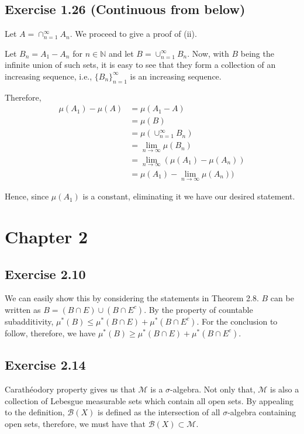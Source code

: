 \documentclass[12pt]{article}
\begin{document}
\subsection{Exercise 1.26 (Continuous from below)}

Let $A = \cap_{n=1}^{\infty} A_n$. We proceed to give a proof of (ii). \vskip 0.5cm

Let  $B_n = A_1 - A_n$ for $n \in \mathbb{N}$ and let $B = \cup_{n=1}^{\infty} B_n$. Now, with $B$ being the infinite union of such sets, it is easy to see that they form a collection of an increasing sequence, i.e., $\{B_n\}_{n=1}^{\infty}$ is an increasing sequence.

Therefore, 
\begin{align*}
\mu(A_1) - \mu(A) &= \mu(A_1 - A) \\
&= \mu(B)  \\
&= \mu(\cup_{n=1}^{\infty} B_n) \\
&= \lim_{n \rightarrow \infty} \mu(B_n)\\
&= \lim_{n \rightarrow \infty} (\mu(A_1) - \mu(A_n))\\
&= \mu(A_1) - \lim_{n \rightarrow \infty}  \mu(A_n))
\end{align*}

Hence, since $\mu(A_1)$ is a constant, eliminating it we have our desired statement.


\section{Chapter 2}

\subsection{Exercise 2.10}

We can easily show this by considering the statements in  Theorem 2.8. $B$ can be written as $B = (B \cap E) \cup (B \cap E^c)$. By the property of countable subadditivity, $\mu^*(B) \leq \mu^*(B \cap E) + \mu^*(B \cap E^c)$. For the conclusion to follow, therefore, we have $\mu^*(B) \geq \mu^*(B \cap E) + \mu^*(B \cap E^c)$. 

\subsection{Exercise 2.14}

Carath\'eodory property gives us that $\mathcal{M}$ is a $\sigma$-algebra. Not only that,  $\mathcal{M}$ is also a collection of Lebesgue measurable sets which contain all open sets. By appealing to the definition, $\mathcal{B}(X)$ is defined as the intersection of all $\sigma$-algebra containing open sets, therefore, we must have that $\mathcal{B}(X) \subset \mathcal{M}$.
\end{document}
